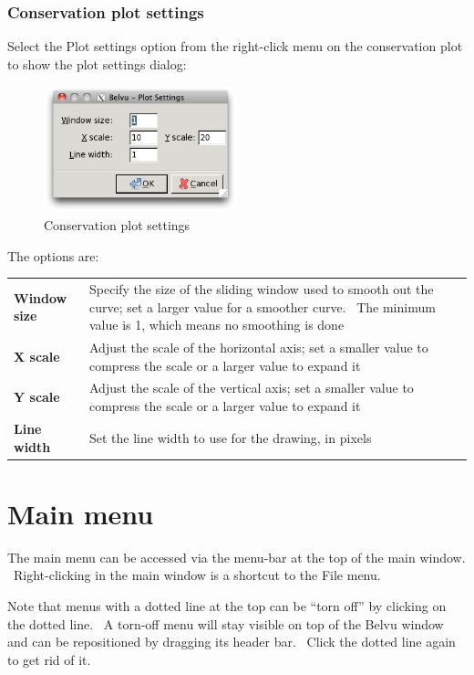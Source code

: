 \documentclass[letterpaper]{article}
\begin{document}
\subsubsection[Conservation plot settings]{Conservation plot settings}
Select the {\textquotesingle}Plot settings{\textquotesingle} option from the right-click menu on the conservation plot to show the plot settings dialog:


\begin{figure}[htb]
\centering
\color{lightblue}
\includegraphics[width=0.5\textwidth]{img_dialog_plot_settings.png}
\caption{Conservation plot settings}
\label{fig:cons_plot_settings}
\end{figure}


The options are:

\begin{supertabular}{>{\bfseries}p{0.2\textwidth} p{0.8\textwidth}}
Window size &
Specify the size of the sliding window used to smooth out the curve; set a larger value for a smoother curve. \ The minimum value is 1, which means no smoothing is done\\
X scale &
Adjust the scale of the horizontal axis; set a smaller value to compress the scale or a larger value to expand it\\
Y scale &
Adjust the scale of the vertical axis; set a smaller value to compress the scale or a larger value to expand it\\
Line width &
Set the line width to use for the drawing, in pixels\\
\end{supertabular}


\section[Main menu]{Main menu}
The main menu can be accessed via the menu-bar at the top of the main window. \ Right-clicking in the main window is a shortcut to the File menu.

Note that menus with a dotted line at the top can be {\textquotedblleft}torn off{\textquotedblright} by clicking on the dotted line. \ A torn-off menu will stay visible on top of the Belvu window and can be repositioned by dragging its header bar. \ Click the dotted line again to get rid of it. 
\end{document}
